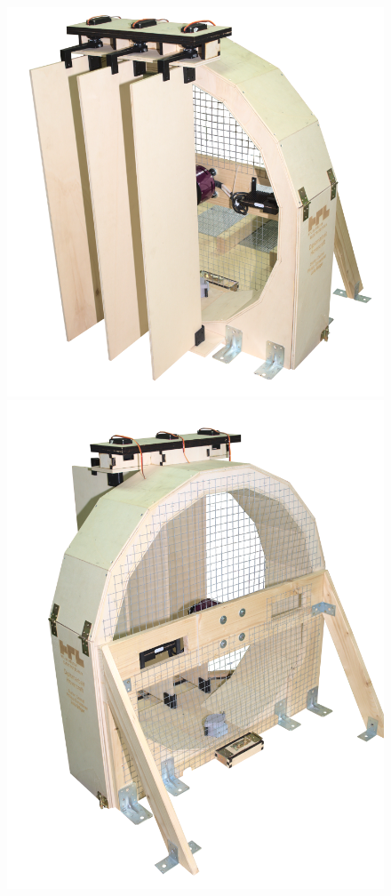 \begin{figure}[H]
    \centering
    \begin{minipage}{0.5\textwidth}
        \includegraphics[width=\textwidth]{Fotos/Konstruktion/DSC_8808.png}
    \end{minipage}
    \hfill
    \begin{minipage}{0.486\textwidth}
        \includegraphics[width=\textwidth]{Fotos/Konstruktion/DSC_8812.png}

\end{minipage}
\end{figure}
